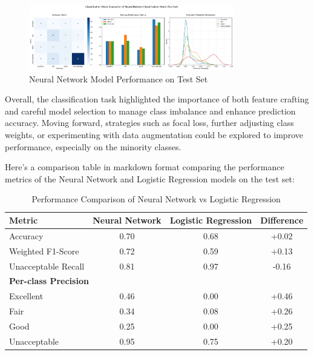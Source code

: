 \documentclass{article}
\begin{document}
\begin{figure}[htbp]
    \centering
    \includegraphics[width=0.8\textwidth]{./Images/NeuralNetworkModel-TestSet-2.png}
    \caption{Neural Network Model Performance on Test Set}
    \label{fig:neural_network_model_performance_2}
\end{figure}

Overall, the classification task highlighted the importance of both feature crafting and careful model selection to manage class imbalance and enhance prediction accuracy. Moving forward, strategies such as focal loss, further adjusting class weights, or experimenting with data augmentation could be explored to improve performance, especially on the minority classes.

Here's a comparison table in markdown format comparing the performance metrics of the Neural Network and Logistic Regression models on the test set:

\begin{table}[htbp]
    \centering
    \caption{Performance Comparison of Neural Network vs Logistic Regression}
    \begin{tabular}{lccc}
        \toprule
        \textbf{Metric} & \textbf{Neural Network} & \textbf{Logistic Regression} & \textbf{Difference} \\
        \midrule
        Accuracy & 0.70 & 0.68 & +0.02 \\
        Weighted F1-Score & 0.72 & 0.59 & +0.13 \\
        Unacceptable Recall & 0.81 & 0.97 & -0.16 \\
        \midrule
        \multicolumn{4}{l}{\textbf{Per-class Precision}} \\
        Excellent & 0.46 & 0.00 & +0.46 \\
        Fair & 0.34 & 0.08 & +0.26 \\
        Good & 0.25 & 0.00 & +0.25 \\
        Unacceptable & 0.95 & 0.75 & +0.20 \\
        \bottomrule
    \end{tabular}
    \label{tab:model_comparison}
\end{table}
\end{document}
